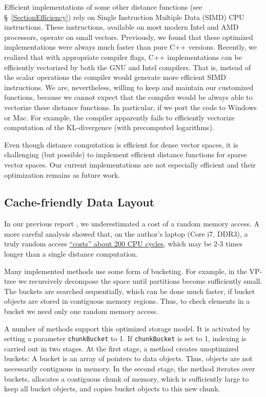 \documentclass[runningheads,a4paper]{llncs}
\newcommand{\ttt}[1]{\texttt{#1}}
\begin{document}
Efficient implementations of some other distance functions (see \S~\ref{SectionEfficiency})
rely on Single Instruction Multiple Data (SIMD) CPU instructions. 
These instructions, available on most modern Intel and AMD processors, 
operate on small vectors. 
Previously, we found that these optimized implementations were always
much faster than pure C++ versions.
Recently, we realized that with appropriate compiler flags,
C++ implementations can be efficiently vectorized by both the GNU and Intel compilers.
That is, instead of the scalar operations the compiler would generate
more efficient SIMD instructions.
We are, nevertheless, willing to keep and maintain our customized functions,
because we cannot expect that the compiler would be always able to vectorize
 these distance functions. 
In particular, if we port the code to Windows or Mac.
For example, the compiler apparently fails to efficiently vectorize 
computation of the KL-divergence (with precomputed logarithms).

Even though distance computation is efficient for dense vector spaces,
it is challenging (but possible) 
to implement efficient distance functions for sparse vector spaces.
Our current implementations are not especially efficient and their optimization
remains as future work.

\subsection{Cache-friendly Data Layout}
In our previous report \cite{Boytsov_and_Bilegsaikhan:sisap2013},
we underestimated a cost of a random memory access.
A more careful analysis showed that, 
on the author's laptop (Core i7, DDR3), 
a truly random access \href{http://searchivarius.org/blog/main-memory-similar-hard-drive}{``costs'' about 200 CPU cycles},
which may be 2-3 times longer than a single distance computation.

Many implemented methods use some form of bucketing.
For example, in the VP-tree we recursively decompose the space
until partitions become sufficiently small.
The buckets are searched sequentially,
which can be done much faster, if bucket objects are stored
in contiguous memory regions.
Thus, to check elements in a bucket we need only one random memory access.

A number of methods support this optimized storage model.
It is activated by setting a parameter \ttt{chunkBucket} to 1.
If \ttt{chunkBucket} is set to 1, indexing is carried out in two stages.
At the first stage, a method creates unoptimized buckets:
A bucket is an array of pointers to data objects.
Thus, objects are not necessarily contiguous in memory.
In the second stage, the method iterates over buckets,
allocates a contiguous chunk of memory,
which is sufficiently large to keep all bucket objects,
and copies bucket objects to this new chunk.
\end{document}
